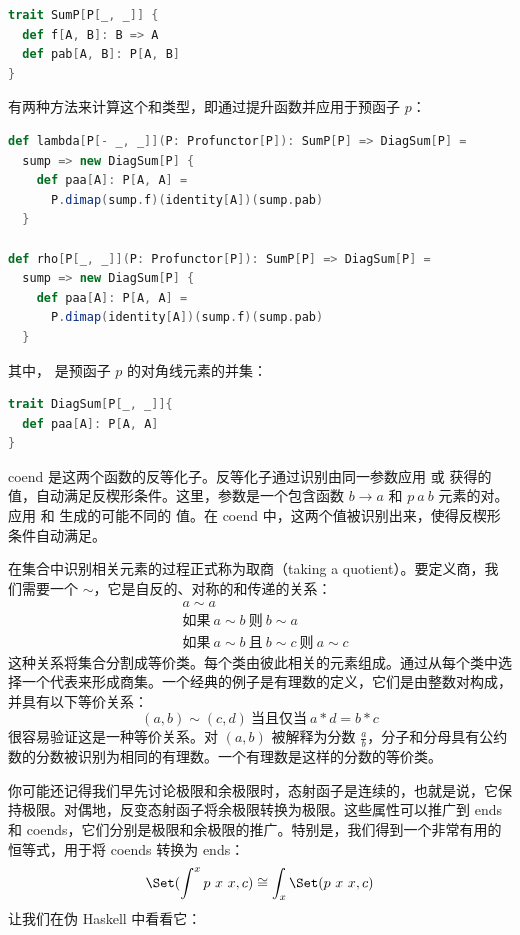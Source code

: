 \begin{lstlisting}[language=Scala]
trait SumP[P[_, _]] {
  def f[A, B]: B => A
  def pab[A, B]: P[A, B]
}
\end{lstlisting}
有两种方法来计算这个和类型，即通过提升函数并应用于预函子 $p$：

\begin{lstlisting}[language=Scala]
def lambda[P[- _, _]](P: Profunctor[P]): SumP[P] => DiagSum[P] =
  sump => new DiagSum[P] {
    def paa[A]: P[A, A] =
      P.dimap(sump.f)(identity[A])(sump.pab)
  }

def rho[P[_, _]](P: Profunctor[P]): SumP[P] => DiagSum[P] =
  sump => new DiagSum[P] {
    def paa[A]: P[A, A] =
      P.dimap(identity[A])(sump.f)(sump.pab)
  }
\end{lstlisting}
其中， 是预函子 $p$ 的对角线元素的并集：

\begin{lstlisting}[language=Scala]
trait DiagSum[P[_, _]]{
  def paa[A]: P[A, A]
}
\end{lstlisting}
coend 是这两个函数的反等化子。反等化子通过识别由同一参数应用  或  获得的值，自动满足反楔形条件。这里，参数是一个包含函数 $b \to a$ 和 $p\ a\ b$ 元素的对。应用  和  生成的可能不同的  值。在 coend 中，这两个值被识别出来，使得反楔形条件自动满足。

在集合中识别相关元素的过程正式称为取商（taking a quotient）。要定义商，我们需要一个 $\sim$，它是自反的、对称的和传递的关系：
\begin{align*}
  & a \sim a                                                         \\
  & \text{如果}\ a \sim b\ \text{则}\ b \sim a                       \\
  & \text{如果}\ a \sim b\ \text{且}\ b \sim c\ \text{则}\ a \sim c
\end{align*}
这种关系将集合分割成等价类。每个类由彼此相关的元素组成。通过从每个类中选择一个代表来形成商集。一个经典的例子是有理数的定义，它们是由整数对构成，并具有以下等价关系：
\[(a, b) \sim (c, d)\ \text{当且仅当}\ a * d = b * c\]
很容易验证这是一种等价关系。对 $(a, b)$ 被解释为分数 $\frac{a}{b}$，分子和分母具有公约数的分数被识别为相同的有理数。一个有理数是这样的分数的等价类。

你可能还记得我们早先讨论极限和余极限时，态射函子是连续的，也就是说，它保持极限。对偶地，反变态射函子将余极限转换为极限。这些属性可以推广到 ends 和 coends，它们分别是极限和余极限的推广。特别是，我们得到一个非常有用的恒等式，用于将 coends 转换为 ends：
\[\Set(\int^x p\ x\ x, c) \cong \int_x \Set(p\ x\ x, c)\]
让我们在伪 Haskell 中看看它：

